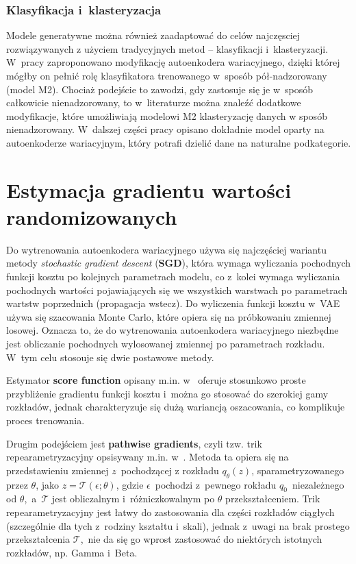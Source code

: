 \documentclass{iithesis}
\begin{document}
\subsubsection{Klasyfikacja i~klasteryzacja}
Modele generatywne można również zaadaptować do celów najczęsciej rozwiązywanych
z użyciem tradycyjnych metod -- klasyfikacji i~klasteryzacji. W~pracy \cite{m2}
zaproponowano modyfikację autoenkodera wariacyjnego, dzięki której mógłby on pełnić rolę
klasyfikatora trenowanego w~sposób pół-nadzorowany (model M2). Chociaż podejście
to zawodzi, gdy zastosuje się je w~sposób całkowicie nienadzorowany, to w~literaturze \cite{gmvae,real_gmvae} można
znaleźć dodatkowe modyfikacje, które umożliwiają modelowi M2 klasteryzację danych w
sposób nienadzorowany. W~dalszej części pracy opisano dokładnie model oparty na autoenkoderze
wariacyjnym, który potrafi dzielić dane na naturalne podkategorie.

\section{Estymacja gradientu wartości randomizowanych}
Do wytrenowania autoenkodera wariacyjnego używa się najczęściej wariantu metody
\textit{stochastic gradient descent} (\textbf{SGD}), która wymaga wyliczania pochodnych
funkcji kosztu po kolejnych parametrach modelu, co z~kolei wymaga wyliczania pochodnych
wartości pojawiających się we wszystkich warstwach po parametrach wartstw poprzednich (propagacja wstecz).
Do wyliczenia funkcji kosztu w~VAE używa się szacowania Monte Carlo, które opiera się na
próbkowaniu zmiennej losowej. Oznacza to, że do wytrenowania autoenkodera wariacyjnego
niezbędne jest obliczanie pochodnych wylosowanej zmiennej po parametrach rozkładu.
W~tym celu stosouje się dwie postawowe metody.

Estymator \textbf{score function} opisany m.in. w~\cite{score_fn} oferuje stosunkowo
proste przybliżenie gradientu funkcji kosztu i~można go stosować do szerokiej gamy rozkładów,
jednak charakteryzuje się dużą wariancją oszacowania, co komplikuje proces trenowania.

Drugim podejściem jest \textbf{pathwise gradients}, czyli tzw. trik repearametryzacyjny
opsisywany m.in. w~\cite{vae}. Metoda ta opiera się na przedstawieniu zmiennej $z$~pochodzącej
z rozkładu $q_\theta(z)$, sparametryzowanego przez $\theta$, jako $z=\mathcal{T}(\epsilon;\theta)$,
gdzie $\epsilon$~pochodzi z~pewnego rokładu $q_0$~niezależnego od
$\theta$,~a~$\mathcal{T}$ jest obliczalnym i~różniczkowalnym po $\theta$ przekształceniem.
Trik repearametryzacyjny jest łatwy do zastosowania dla części rozkładów ciągłych
(szczególnie dla tych z~rodziny kształtu i~skali), jednak z~uwagi na brak prostego przekształcenia
$\mathcal{T}$,~nie da się go wprost zastosować do niektórych istotnych rozkładów, np. Gamma i~Beta.
\end{document}
